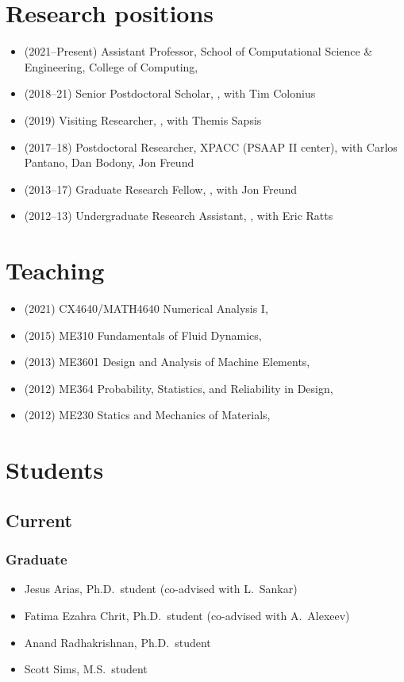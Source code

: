 \section{Research positions}

\begin{itemize}
    \item (2021--Present) Assistant Professor, School of Computational Science \& Engineering, College of Computing, \GIT
    \item (2018--21) Senior Postdoctoral Scholar, \CIT, with Tim Colonius
    \item (2019) Visiting Researcher, \MIT, with Themis Sapsis
    \item (2017--18) Postdoctoral Researcher, XPACC (PSAAP II center), with Carlos Pantano, Dan Bodony, Jon Freund
    \item (2013--17) Graduate Research Fellow, \UIUC, with Jon Freund
    \item (2012--13) Undergraduate Research Assistant, \UMD, with Eric Ratts
\end{itemize}

\section{Teaching}

\begin{itemize}
    \item (2021) CX4640/MATH4640 Numerical Analysis I, \GIT
    \item (2015) ME310 Fundamentals of Fluid Dynamics, \UIUC
    \item (2013) ME3601 Design and Analysis of Machine Elements, \UMD
    \item (2012) ME364 Probability, Statistics, and Reliability in Design, \UMD
    \item (2012) ME230 Statics and Mechanics of Materials, \UMD
\end{itemize}


\section{Students}

\subsection{Current}

\subsubsection{Graduate}
\begin{itemize}
    \item Jesus Arias, Ph.D.\ student (co-advised with L.\ Sankar)
    \item Fatima Ezahra Chrit, Ph.D.\ student (co-advised with A.\ Alexeev)
    \item Anand Radhakrishnan, Ph.D.\ student
    \item Scott Sims, M.S.\ student
\end{itemize}

